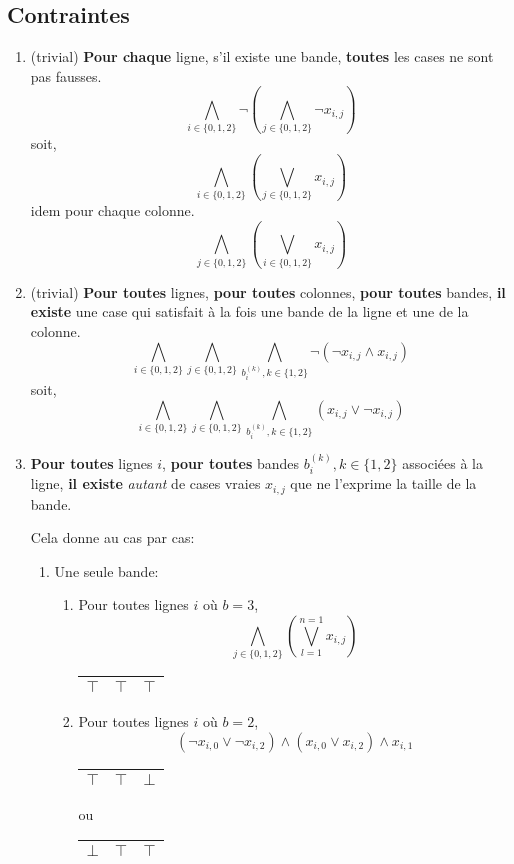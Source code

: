 \documentclass[a4paper,12pt]{report}
\begin{document}
\subsection{Contraintes}
\begin{enumerate}

\item (trivial) \textbf{Pour chaque} ligne, s'il existe une bande, \textbf{toutes} les cases ne sont pas fausses.
$$ \bigwedge_{i \in \{0,1,2\}} \lnot \left( \bigwedge_{j \in \{0,1,2\}} \lnot x_{i,j} \right) $$
soit,
$$ \bigwedge_{i \in \{0,1,2\}} \left( \bigvee_{j \in \{0,1,2\}} x_{i,j} \right) $$
idem pour chaque colonne.
$$ \bigwedge_{j \in \{0,1,2\}} \left( \bigvee_{i \in \{0,1,2\}} x_{i,j} \right) $$

\item (trivial) \textbf{Pour toutes} lignes, \textbf{pour toutes} colonnes, \textbf{pour toutes} bandes, \textbf{il existe} une case qui satisfait à la fois une bande de la ligne et une de la colonne.
$$\bigwedge_{i \in \{0,1,2\}} \bigwedge_{j \in \{0,1,2\}} \bigwedge_{b_i^{(k)}, k\in\{1,2\}} 
\lnot \left(
	\lnot x_{i,j} \wedge x_{i,j}
\right)$$
soit,
$$\bigwedge_{i \in \{0,1,2\}} \bigwedge_{j \in \{0,1,2\}} \bigwedge_{b_i^{(k)}, k\in\{1,2\}} 
\left(
	x_{i,j} \vee \lnot x_{i,j}
\right)$$

\item \textbf{Pour toutes} lignes $i$, \textbf{pour toutes} bandes $b_i^{(k)}, k\in\{1,2\}$ associées à la ligne, \textbf{il existe} \textit{autant} de cases vraies $x_{i,j}$ que ne l'exprime la taille de la bande. 

Cela donne au cas par cas:
	\begin{enumerate}
		\item Une seule bande: 
		\begin{enumerate}
			\item Pour toutes lignes $i$ où $b=3$, 
			$$\bigwedge_{j\in\{0,1,2\}}\left( \bigvee_{l=1}^{n=1} x_{i,j} \right)$$
			\begin{center}						
			\begin{tabular}{|c|c|c|}
			\hline 
			$\top$ & $\top$  & $\top$  \\ 
			\hline  
			\end{tabular}
			\end{center}

			\item Pour toutes lignes $i$ où $b=2$, 
			$$(\lnot x_{i,0} \vee \lnot x_{i,2}) \wedge (x_{i,0} \vee x_{i,2}) \wedge x_{i,1}$$
			\begin{center}						
			\begin{tabular}{|c|c|c|}
			\hline 
			$\top$ & $\top$  & $\bot$  \\ 
			\hline  
			\end{tabular}
			ou
			\begin{tabular}{|c|c|c|}
			\hline 
			$\bot$ & $\top$  & $\top$  \\ 
			\hline  
			\end{tabular}
			\end{center}
			

\end{enumerate}
\end{enumerate}
\end{enumerate}
\end{document}
